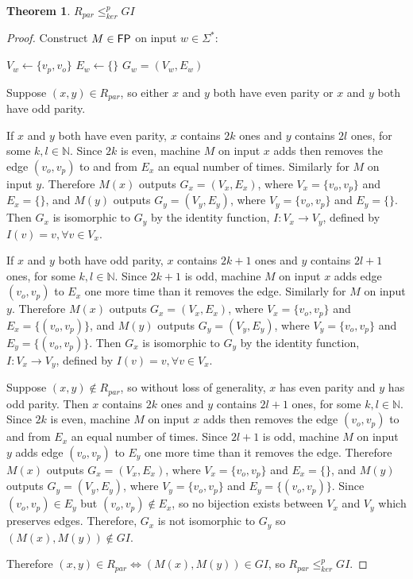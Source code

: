 \documentclass[draft]{article}
\newtheorem{theorem}{Theorem}%
\theoremstyle{definition}
\newcommand{\sigmastar}{\Sigma^{*}}
\newcommand{\kr}{\leq^{p}_{ker}} %
\begin{document}
\begin{theorem}\label{thm:rpar_gi}$R_{par}\kr GI$\end{theorem}
\begin{proof}
  Construct $M\in {\ensuremath{\mathsf{FP}}}$ on input $w\in\sigmastar$:\\
  \begin{algorithm}[H]
    $V_w\gets\{v_p, v_o\}$\;
    $E_w\gets\{\}$ \;
    \Return $G_w=(V_w, E_w)$
  \end{algorithm}

  Suppose $(x, y)\in R_{par}$, so either $x$ and $y$ both have even parity or
  $x$ and $y$ both have odd parity. 

  If $x$ and $y$ both have even parity, $x$ contains $2k$ ones and $y$ contains
  $2l$ ones, for some $k,l\in\mathbb{N}$. Since $2k$ is even, machine $M$ on
  input $x$ adds then removes the edge $(v_o, v_p)$ to and from $E_x$ an equal
  number of times. Similarly for $M$ on input $y$. Therefore $M(x)$ outputs
  $G_x=(V_x, E_x)$, where $V_x=\{v_o, v_p\}$ and $E_x=\{\}$, and $M(y)$ outputs
  $G_y=(V_y, E_y)$, where $V_y=\{v_o, v_p\}$ and $E_y=\{\}$. Then $G_x$ is
  isomorphic to $G_y$ by the identity function, $I:V_x\to V_y$, defined by
  $I(v)=v, \forall v\in V_x$.

  If $x$ and $y$ both have odd parity, $x$ contains $2k+1$ ones and $y$
  contains $2l+1$ ones, for some $k,l\in\mathbb{N}$. Since $2k+1$ is odd,
  machine $M$ on input $x$ adds edge $(v_o, v_p)$ to $E_x$ one more time than
  it removes the edge. Similarly for $M$ on input $y$. Therefore $M(x)$ outputs
  $G_x=(V_x, E_x)$, where $V_x=\{v_o, v_p\}$ and $E_x=\{(v_o, v_p)\}$, and
  $M(y)$ outputs $G_y=(V_y, E_y)$, where $V_y=\{v_o, v_p\}$ and $E_y=\{(v_o,
  v_p)\}$. Then $G_x$ is isomorphic to $G_y$ by the identity function,
  $I:V_x\to V_y$, defined by $I(v)=v, \forall v\in V_x$.

  Suppose $(x, y)\notin R_{par}$, so without loss of generality, $x$ has even
  parity and $y$ has odd parity. Then $x$ contains $2k$ ones and $y$ contains
  $2l+1$ ones, for some $k,l\in\mathbb{N}$. Since $2k$ is even, machine $M$ on
  input $x$ adds then removes the edge $(v_o, v_p)$ to and from $E_x$ an equal
  number of times. Since $2l+1$ is odd, machine $M$ on input $y$ adds edge
  $(v_o, v_p)$ to $E_y$ one more time than it removes the edge. Therefore
  $M(x)$ outputs $G_x=(V_x, E_x)$, where $V_x=\{v_o, v_p\}$ and $E_x=\{\}$, and
  $M(y)$ outputs $G_y=(V_y, E_y)$, where $V_y=\{v_o, v_p\}$ and $E_y=\{(v_o,
  v_p)\}$. Since $(v_o, v_p)\in E_y$ but $(v_o, v_p)\notin E_x$, so no
  bijection exists between $V_x$ and $V_y$ which preserves edges. Therefore,
  $G_x$ is not isomorphic to $G_y$ so $(M(x), M(y))\notin GI$.

  Therefore $(x, y)\in R_{par} \iff (M(x), M(y)) \in GI$, so $R_{par} \kr GI$.
\end{proof}
\end{document}
